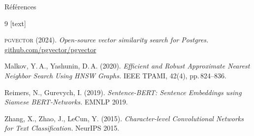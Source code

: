 \documentclass[aspectratio=169, 10pt]{beamer}
\begin{document}
\begin{frame}{R\'{e}f\'{e}rences}
  \begin{thebibliography}{9}
    [text]

    \textsc{pgvector} (2024).
    \textit{Open-source vector similarity search for Postgres.}
    \href{https://github.com/pgvector/pgvector}{github.com/pgvector/pgvector}

    Malkov, Y.\,A., Yashunin, D.\,A. (2020).
    \textit{Efficient and Robust Approximate Nearest Neighbor Search Using HNSW Graphs.}
    IEEE TPAMI, 42(4), pp.\,824--836.

    Reimers, N., Gurevych, I. (2019).
    \textit{Sentence-BERT: Sentence Embeddings using Siamese BERT-Networks.}
    EMNLP 2019.

    Zhang, X., Zhao, J., LeCun, Y. (2015).
    \textit{Character-level Convolutional Networks for Text Classification.}
    NeurIPS 2015.

  \end{thebibliography}
\end{frame}


\end{document}
